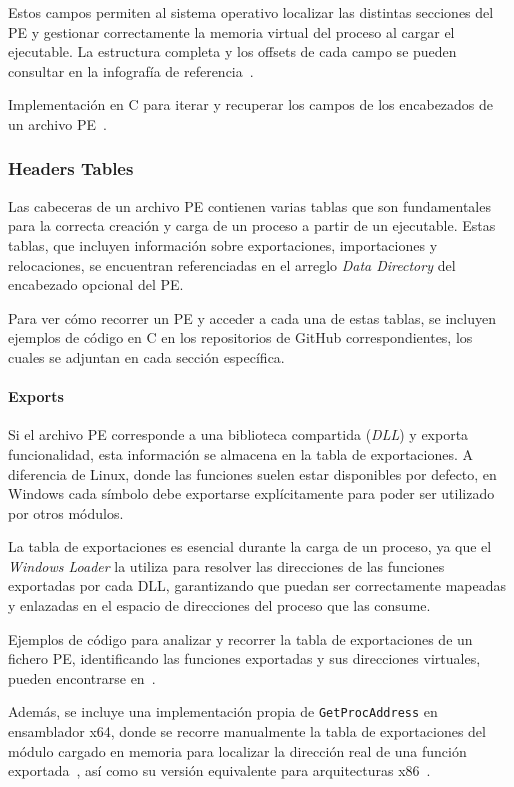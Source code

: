 Estos campos permiten al sistema operativo localizar las distintas secciones del PE y gestionar correctamente la memoria virtual del proceso al cargar el ejecutable. La estructura completa y los offsets de cada campo se pueden consultar en la infografía de referencia~\cite{peinfografia}.

Implementación en C para iterar y recuperar los campos de los encabezados de un archivo PE~\cite{walking_PE_headers}.

\subsubsection{Headers Tables}

Las cabeceras de un archivo PE contienen varias tablas que son fundamentales para la correcta creación y carga de un proceso a partir de un ejecutable.  
Estas tablas, que incluyen información sobre exportaciones, importaciones y relocaciones, se encuentran referenciadas en el arreglo \textit{Data Directory} del encabezado opcional del PE.

Para ver cómo recorrer un PE y acceder a cada una de estas tablas, se incluyen ejemplos de código en C en los repositorios de GitHub correspondientes, los cuales se adjuntan en cada sección específica.

\paragraph{Exports}

Si el archivo PE corresponde a una biblioteca compartida (\textit{DLL}) y exporta funcionalidad, 
esta información se almacena en la tabla de exportaciones.  
A diferencia de Linux, donde las funciones suelen estar disponibles por defecto, en Windows 
cada símbolo debe exportarse explícitamente para poder ser utilizado por otros módulos.

La tabla de exportaciones es esencial durante la carga de un proceso, ya que el \textit{Windows Loader} 
la utiliza para resolver las direcciones de las funciones exportadas por cada DLL, garantizando que puedan 
ser correctamente mapeadas y enlazadas en el espacio de direcciones del proceso que las consume.

Ejemplos de código para analizar y recorrer la tabla de exportaciones de un fichero PE, 
identificando las funciones exportadas y sus direcciones virtuales, pueden encontrarse en~\cite{walking_PE_exports}.  

Además, se incluye una implementación propia de \texttt{GetProcAddress} en ensamblador x64, 
donde se recorre manualmente la tabla de exportaciones del módulo cargado en memoria para localizar 
la dirección real de una función exportada~\cite{x64_get_proc}, así como su versión 
equivalente para arquitecturas x86~\cite{x86_get_proc}.

